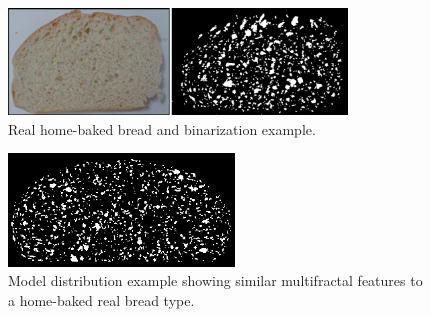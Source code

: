 \documentclass[spanish,a4paper,openright,11pt]{book}
\begin{document}
\begin{figure}[!ht]
\begin{center}
\includegraphics[width=9cm]{figures/realbin2}
\caption{ Real home-baked bread and binarization example.}
\label{realbin2}
\end{center}
\end{figure}

\begin{figure}[!ht]
\begin{center}
\includegraphics[width=6cm]{figures/best2}
\caption{Model distribution example showing similar multifractal features to a home-baked real bread type.}
\label{best2}
\end{center}
\end{figure}





\end{document}
